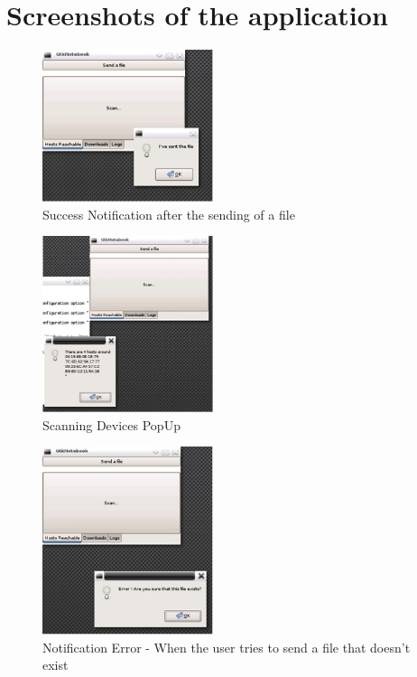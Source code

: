 \documentclass[a4paper, 12pt, final]{article}
\begin{document}
\section{Screenshots of the application}  

\begin{figure}[!h] %
\centering
\includegraphics[width=5cm]{1.jpg} %
\caption{Success Notification after the sending of a file} %
\label{api} %
\end{figure} %

\begin{figure}[!h] %
\centering
\includegraphics[width=5cm]{2.jpg} %
\caption{Scanning Devices PopUp} %
\label{api} %
\end{figure} %

\begin{figure}[!h] %
\centering
\includegraphics[width=5cm]{3.jpg} %
\caption{Notification Error - When the user tries to send a file that doesn't exist} %
\label{api} %
\end{figure} %
\end{document}
